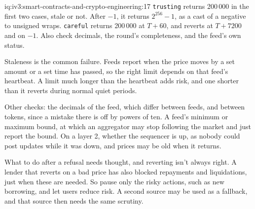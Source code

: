 \begin{solution}{iq:iv3:smart-contracts-and-crypto-engineering:17}
\texttt{trusting} returns 200\,000 in the first two cases, stale or not. After $-1$, it returns $2^{256} - 1$, as a cast of a negative to unsigned wraps. \texttt{careful} returns 200\,000 at $T + 60$, and reverts at $T + 7200$ and on $-1$. Also check decimals, the round's completeness, and the feed's own status.

Staleness is the common failure. Feeds report when the price moves by a set amount or a set time has passed, so the right limit depends on that feed's heartbeat. A limit much longer than the heartbeat adds risk, and one shorter than it reverts during normal quiet periods.

Other checks: the decimals of the feed, which differ between feeds, and between tokens, since a mistake there is off by powers of ten. A feed's minimum or maximum bound, at which an aggregator may stop following the market and just report the bound. On a layer 2, whether the sequencer is up, as nobody could post updates while it was down, and prices may be old when it returns.

What to do after a refusal needs thought, and reverting isn't always right. A lender that reverts on a bad price has also blocked repayments and liquidations, just when these are needed. So pause only the risky actions, such as new borrowing, and let users reduce risk. A second source may be used as a fallback, and that source then needs the same scrutiny.

\end{solution}

